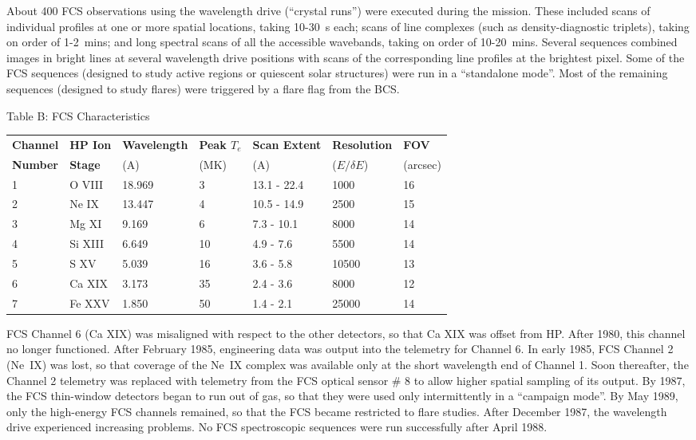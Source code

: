 About 400 FCS observations using the wavelength drive (``crystal runs'') were
executed during the mission. These included scans of individual profiles at one
or more spatial locations, taking 10-30~s each; scans of line complexes
(such as density-diagnostic triplets), taking on order of 1-2~mins; and long
spectral scans of all the accessible wavebands, taking on order of 10-20~mins.
Several sequences combined images in bright lines at several wavelength drive
positions with scans of the corresponding line profiles at the brightest pixel.
Some of the FCS sequences (designed to study active regions or quiescent solar
structures) were run in a ``standalone mode''. Most of the remaining sequences
(designed to study flares) were triggered by a flare flag from the BCS.

\begin{center}
                     Table B: FCS Characteristics
\medskip
\begin{tabular}{||l l l l l l l ||}
\hline
{\bf Channel} & {\bf HP Ion} & {\bf Wavelength} & {\bf Peak $T_e$} &  {\bf Scan
Extent} & {\bf Resolution} &    {\bf  FOV}  \\
{\bf Number} &  {\bf Stage}  &   (A)   &    (MK)     &   (A)    & ($E/\delta E$)
&  (arcsec)\\
\hline
   1 &    O VIII & 18.969  &      3  &   13.1 - 22.4  &    1000  &        16  \\
   2 &    Ne IX  & 13.447  &      4  &   10.5 - 14.9  &    2500  &        15  \\
   3 &    Mg XI  &  9.169  &      6  &    7.3 - 10.1  &    8000  &        14  \\
   4 &    Si XIII &  6.649  &     10 &     4.9 -  7.6 &    5500  &        14  \\
   5 &    S XV   &  5.039  &     16  &    3.6 -  5.8  &   10500  &        13  \\
   6 &    Ca XIX &  3.173  &     35  &    2.4 -  3.6  &    8000  &        12  \\
   7 &    Fe XXV &  1.850  &     50  &    1.4 -  2.1  &    25000 &        14  \\
\hline
\end{tabular}
\end{center}

FCS Channel 6 (Ca XIX) was misaligned with respect to the other detectors, so
that Ca XIX was offset from HP. After 1980, this channel no longer functioned.
After February 1985, engineering data was output into the telemetry
for Channel 6. In early 1985, FCS Channel 2 (Ne~IX) was lost, so that coverage
of the Ne~IX complex was available only at the short wavelength end of Channel
1. Soon thereafter, the Channel 2 telemetry was replaced with telemetry from
the FCS optical sensor \# 8 to allow higher spatial sampling of its output. By
1987, the FCS thin-window detectors began to run out of gas, so that they were
used only intermittently in a ``campaign mode''.  By May 1989, only the
high-energy FCS channels remained, so that the FCS became restricted to flare
studies. After December 1987, the wavelength drive experienced increasing
problems. No FCS spectroscopic sequences were run successfully after April
1988.

